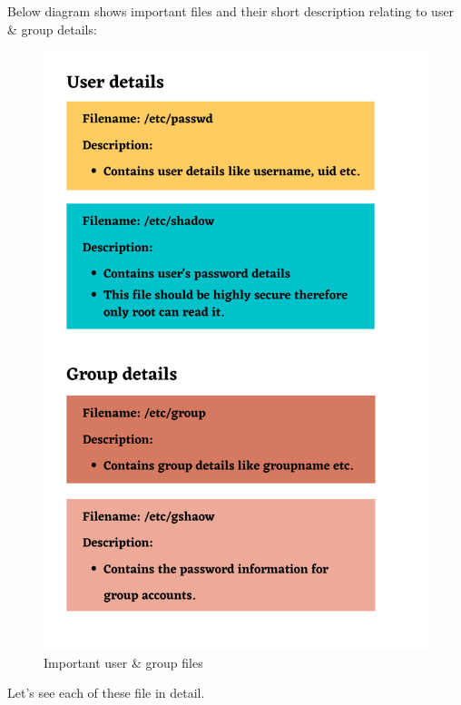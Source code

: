 \setlength{\columnsep}{3pt}
\begin{flushleft}

	Below diagram shows important files and their short description relating to user \& group details:
	\begin{figure}[h!]
	\centering
	\includegraphics[scale=0.4]{content/chapter4/images/users6.png}
	\caption{Important user \& group files}
	\label{fig:prime_secondary_group12}
\end{figure}

Let's see each of these file in detail.

\newpage


\end{flushleft}
